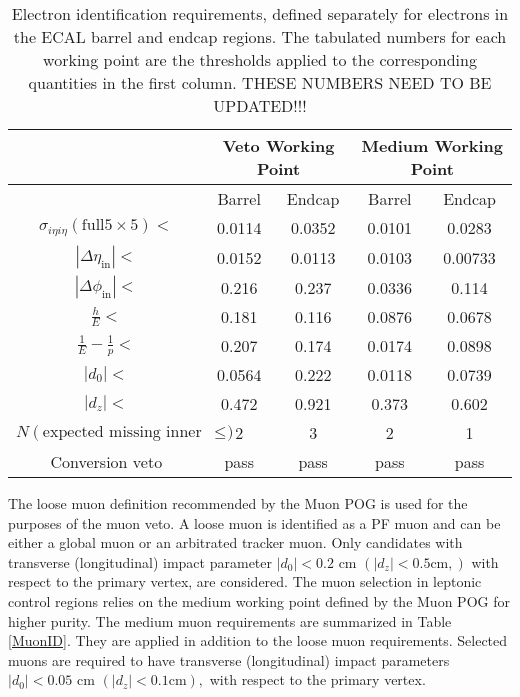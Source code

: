  \begin{table}
 \centering
 \begin{tabular}{|*{5}{c|}}
 \hline
 \multirow{2}{*}{} & \multicolumn{2}{c}{Veto Working Point} & \multicolumn{2}{|c|}{Medium Working Point} \\
 \hline
 & Barrel & Endcap & Barrel & Endcap \\
\hline
$\sigma_{i\eta i \eta} (\text{full} 5 \times 5) <$ & 0.0114 & 0.0352 & 0.0101 & 0.0283 \\
$|\Delta\eta_{\text{in}}|<$ & 0.0152 & 0.0113 & 0.0103 & 0.00733 \\
$|\Delta\phi_{\text{in}}|<$ & 0.216 & 0.237 & 0.0336 & 0.114 \\
$\frac{h}{E} <$ & 0.181 & 0.116 & 0.0876 & 0.0678 \\
$\frac{1}{E}-\frac{1}{p}<$ & 0.207 & 0.174 & 0.0174 & 0.0898 \\
$|d_0|<$ & 0.0564 & 0.222 & 0.0118 & 0.0739 \\
$|d_z|<$ & 0.472 & 0.921 & 0.373 & 0.602 \\
$N(\text{expected missing inner hits})\leq$ & 2 & 3 & 2 & 1 \\
Conversion veto & pass & pass & pass & pass \\
\hline
 \end{tabular}
 \caption[Electron Identification Parameters]{Electron identification requirements, defined separately for electrons in the ECAL barrel and endcap regions. The tabulated numbers for each working point are the thresholds applied to the corresponding quantities in the first column. THESE NUMBERS NEED TO BE UPDATED!!!}
 \label{ElectronID}
 \end{table}
 
 The loose muon definition recommended by the Muon POG is used for the purposes of the muon veto. A loose muon is identified as a PF muon and can be either a global muon or an arbitrated tracker muon. Only candidates with transverse (longitudinal) impact parameter $|d_0|<0.2$ cm $(|d_z|<0.5 \text{cm},)$ with respect to the primary vertex, are considered. The muon selection in leptonic control regions relies on the medium working point defined by the Muon POG for higher purity. The medium muon requirements are summarized in Table \ref{MuonID}. They are applied in addition to the loose muon requirements. Selected muons are required to have transverse (longitudinal) impact parameters $|d_0|<0.05$ cm $(|d_z|<0.1 \text{cm}),$ with respect to the primary vertex. 

